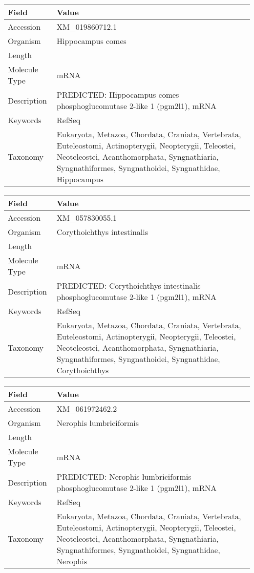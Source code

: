 \documentclass[10pt]{article}
\begin{document}
{\footnotesize
\begin{longtable}{>{\raggedright\arraybackslash}p{4.5cm} >{\raggedright\arraybackslash}p{11.5cm}}
\textbf{Field} & \textbf{Value} \\
\hline
Accession & XM\_019860712.1 \\
Organism & Hippocampus comes \\
Length & 2263 \\
Molecule Type & mRNA \\
Description & PREDICTED: Hippocampus comes phosphoglucomutase 2-like 1 (pgm2l1), mRNA \\
Keywords & RefSeq \\
Taxonomy & Eukaryota, Metazoa, Chordata, Craniata, Vertebrata, Euteleostomi, Actinopterygii, Neopterygii, Teleostei, Neoteleostei, Acanthomorphata, Syngnathiaria, Syngnathiformes, Syngnathoidei, Syngnathidae, Hippocampus \\
\end{longtable}
}

{\footnotesize
\begin{longtable}{>{\raggedright\arraybackslash}p{4.5cm} >{\raggedright\arraybackslash}p{11.5cm}}
\textbf{Field} & \textbf{Value} \\
\hline
Accession & XM\_057830055.1 \\
Organism & Corythoichthys intestinalis \\
Length & 2215 \\
Molecule Type & mRNA \\
Description & PREDICTED: Corythoichthys intestinalis phosphoglucomutase 2-like 1 (pgm2l1), mRNA \\
Keywords & RefSeq \\
Taxonomy & Eukaryota, Metazoa, Chordata, Craniata, Vertebrata, Euteleostomi, Actinopterygii, Neopterygii, Teleostei, Neoteleostei, Acanthomorphata, Syngnathiaria, Syngnathiformes, Syngnathoidei, Syngnathidae, Corythoichthys \\
\end{longtable}
}

{\footnotesize
\begin{longtable}{>{\raggedright\arraybackslash}p{4.5cm} >{\raggedright\arraybackslash}p{11.5cm}}
\textbf{Field} & \textbf{Value} \\
\hline
Accession & XM\_061972462.2 \\
Organism & Nerophis lumbriciformis \\
Length & 5127 \\
Molecule Type & mRNA \\
Description & PREDICTED: Nerophis lumbriciformis phosphoglucomutase 2-like 1 (pgm2l1), mRNA \\
Keywords & RefSeq \\
Taxonomy & Eukaryota, Metazoa, Chordata, Craniata, Vertebrata, Euteleostomi, Actinopterygii, Neopterygii, Teleostei, Neoteleostei, Acanthomorphata, Syngnathiaria, Syngnathiformes, Syngnathoidei, Syngnathidae, Nerophis \\
\end{longtable}
}
\end{document}
